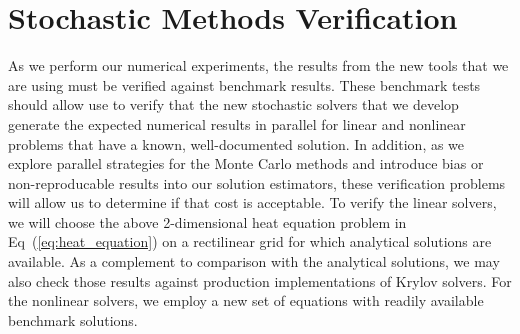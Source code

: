 \section{Stochastic Methods Verification}
\label{sec:method_verification}
As we perform our numerical experiments, the results from the new
tools that we are using must be verified against benchmark
results. These benchmark tests should allow use to verify that the new
stochastic solvers that we develop generate the expected numerical
results in parallel for linear and nonlinear problems that have a
known, well-documented solution. In addition, as we explore parallel
strategies for the Monte Carlo methods and introduce bias or
non-reproducable results into our solution estimators, these
verification problems will allow us to determine if that cost is
acceptable. To verify the linear solvers, we will choose the above
2-dimensional heat equation problem in Eq~(\ref{eq:heat_equation}) on
a rectilinear grid for which analytical solutions are available. As a
complement to comparison with the analytical solutions, we may also
check those results against production implementations of Krylov
solvers. For the nonlinear solvers, we employ a new set of equations
with readily available benchmark solutions.

